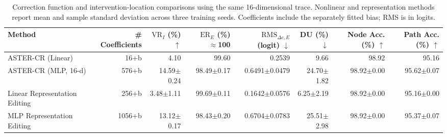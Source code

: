 \begin{table}[t]
\centering
\small
\setlength{\tabcolsep}{3pt}
\begin{tabularx}{\textwidth}{@{}>{\raggedright\arraybackslash}Xrrrrrrr@{}}
\toprule
Method & \# Coefficients & \shortstack{$\mathrm{VR}_{I}$\\ (\%) $\uparrow$} & \shortstack{$\mathrm{ER}_{E}$\\ (\%) $\approx$100} & \shortstack{$\mathrm{RMS}_{\Delta c,E}$\\ (logit) $\downarrow$} & \shortstack{DU\\ (\%) $\downarrow$} & \shortstack{Node Acc.\\ (\%) $\uparrow$} & \shortstack{Path Acc.\\ (\%) $\uparrow$} \\
\midrule
ASTER-CR (Linear) & 16+b & 4.10 & 99.60 & 0.2539 & 9.66 & 98.92 & 95.16 \\
ASTER-CR (MLP, 16-d) & 576+b & 14.59$\pm$0.24 & 98.49$\pm$0.17 & 0.6491$\pm$0.0479 & 24.70$\pm$1.82 & 98.92$\pm$0.00 & 95.62$\pm$0.07 \\
Linear Representation Editing & 256+b & 3.48$\pm$1.11 & 99.69$\pm$0.11 & 0.1642$\pm$0.0576 & 6.25$\pm$2.19 & 98.92$\pm$0.00 & 95.16$\pm$0.00 \\
MLP Representation Editing & 1056+b & 13.12$\pm$0.17 & 98.43$\pm$0.20 & 0.6704$\pm$0.0783 & 25.51$\pm$2.98 & 98.92$\pm$0.00 & 95.37$\pm$0.07 \\
\bottomrule
\end{tabularx}
\caption{Correction function and intervention-location comparisons using the same 16-dimensional trace. Nonlinear and representation methods report mean and sample standard deviation across three training seeds. Coefficients include the separately fitted bias; RMS is in logits.}
\label{tab:aster-main-19}
\end{table}
